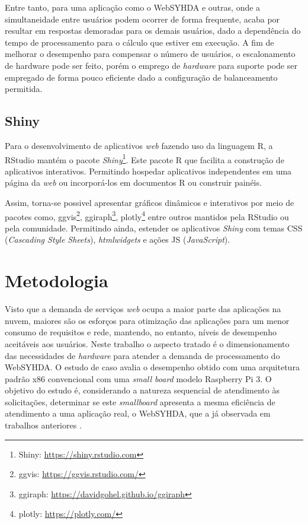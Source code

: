 \documentclass[12pt,english,brazil]{article}
\begin{document}
Entre tanto, para uma aplicação como o WebSYHDA e outras, onde a simultaneidade entre usuários podem ocorrer de forma frequente, acaba por resultar em respostas demoradas para os demais usuários, dado a dependência do tempo de processamento para o cálculo que estiver em execução. A fim de melhorar o desempenho para compensar o número de usuários, o escalonamento de hardware pode ser feito, porém o emprego de \emph{hardware} para suporte pode ser empregado de forma pouco eficiente dado a configuração de balanceamento permitida. %

\subsection{Shiny} \label{sec:Shiny}

Para o desenvolvimento de aplicativos \emph{web} fazendo uso da linguagem R, a RStudio mantém o pacote \emph{Shiny}\footnote{Shiny: \url{https://shiny.rstudio.com}}. Este pacote R que facilita a construção de aplicativos interativos. Permitindo hospedar aplicativos independentes em uma página da \emph{web} ou incorporá-los em documentos R  ou construir painéis. 

Assim, torna-se possivel apresentar gráficos dinâmicos e interativos por meio de pacotes como, ggvis\footnote{ggvis: \url{https://ggvis.rstudio.com/}}, ggiraph\footnote{ggiraph: \url{https://davidgohel.github.io/ggiraph}}, plotly\footnote{plotly: \url{https://plotly.com/}} entre outros mantidos pela RStudio ou pela comunidade. Permitindo ainda, estender os aplicativos \emph{Shiny} com temas CSS (\emph{Cascading Style Sheets}), \emph{htmlwidgets} e ações JS (\emph{JavaScript}).


\section{Metodologia} \label{sec:metodologia}

Visto que a demanda de serviços \textit{web} ocupa a maior parte das aplicações na nuvem, maiores são os esforços para otimização das aplicações para um menor consumo de requisitos e rede, mantendo, no entanto, níveis de desempenho aceitáveis aos usuários. Neste trabalho o aspecto tratado é o dimensionamento das necessidades de \emph{hardware} para atender a demanda de processamento do WebSYHDA. O estudo de caso avalia o desempenho obtido com uma arquitetura padrão x86 convencional com uma \emph{small board} modelo Raspberry Pi 3. O objetivo do estudo é, considerando a natureza sequencial de atendimento às solicitações, determinar se este \emph{smallboard} apresenta a mesma eficiência de atendimento a uma aplicação real, o WebSYHDA, que a já observada em trabalhos anteriores  \cite{silva2019estudo}.
\end{document}
